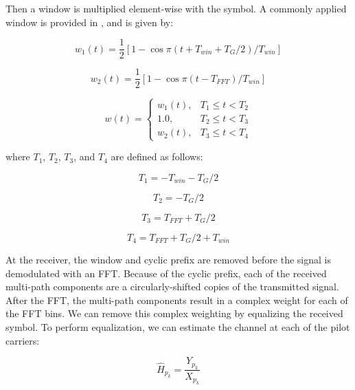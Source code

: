 \documentclass[conference]{IEEEtran}
\begin{document}
		Then a window is multiplied element-wise with the symbol. A commonly applied window is provided in \cite{djordjevic-2017}, and is given by:
		
		\begin{equation}
			w_1(t) = \frac{1}{2}[1 - \cos\pi(t + T_{win} + T_G/2)/T_{win}]
		\end{equation}
		
		\begin{equation}
			w_2(t) = \frac{1}{2}[1 - \cos\pi(t - T_{FFT})/T_{win}]
		\end{equation}
		
		\begin{equation}
			w(t) = \begin{cases}
				w_1(t), & T_1 \leq t < T_2 \\
				1.0, & T_2 \leq t < T_3 \\
				w_2(t), & T_3 \leq t < T_4
			\end{cases}
		\end{equation}
		
		where $T_1$, $T_2$, $T_3$, and $T_4$ are defined as follows:
		
		\begin{equation}
			T_1 = -T_{win} - T_G/2
		\end{equation}
		
		\begin{equation}
			T_2 = -T_G/2
		\end{equation}
		
		\begin{equation}
			T_3 = T_{FFT} + T_G/2
		\end{equation}
		
		\begin{equation}
			T_4 = T_{FFT} + T_G/2 + T_{win}
		\end{equation}
		
		At the receiver, the window and cyclic prefix are removed before the signal is demodulated with an FFT. Because of the cyclic prefix, each of the received multi-path components are a circularly-shifted copies of the transmitted signal. After the FFT, the multi-path components result in a complex weight for each of the FFT bins. We can remove this complex weighting by equalizing the received symbol. To perform equalization, we can estimate the channel at each of the pilot carriers:
		
		\begin{equation}
			\hat{H}_{p_k} = \frac{Y_{p_k}}{X_{p_k}}
		\end{equation}
		
\end{document}
